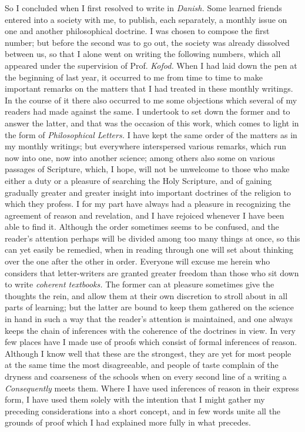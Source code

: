 \documentclass[12pt,a4paper,openany]{book}
\newcommand{\opage}[1]{\marginnote{\footnotesize\textit{[#1]}}}
\begin{document}
So I concluded when I first resolved to write in \emph{Danish.} Some learned
friends entered into a society with me, to publish, each separately, a monthly
issue on one and another philosophical doctrine. I was chosen to compose the first
number; but before the second was to go out, the society was already dissolved
between us, so that I alone went on writing the following numbers, which all
appeared under the supervision of Prof. \textit{Kofod.} When I had laid down the
pen at the beginning of last year, it occurred to me from time to time to make
important remarks on the matters that I had treated in these monthly writings. In
the course of it there also occurred to me some objections which several of my
readers had made against the same. I undertook to set down the former and to
answer the latter, and that was the occasion of this work, which comes to light in
the form of \emph{Philosophical Letters.} I have kept the same order of the
matters as in my monthly writings; but everywhere interspersed various remarks,
which run now into one, now into another science; among others also some on
various passages of Scripture, which, I hope, will not be unwelcome to those who
make either a duty
\setcounter{footnote}{0}%
\opage{39}or a pleasure of searching the Holy Scripture, and of gaining gradually
greater and greater insight into important doctrines of the religion to which they
profess. I for my part have always had a pleasure in recognizing the agreement of
reason and revelation, and I have rejoiced whenever I have been able to find it.
Although the order sometimes seems to be confused, and the reader's attention
perhaps will be divided among too many things at once, so
this can yet easily be remedied, when in reading through one will set about
thinking over the one after the other in order. Everyone will excuse me herein who
considers that letter-writers are granted greater freedom than those who sit down
to write \emph{coherent textbooks.} The former can at pleasure sometimes give the
thoughts the rein, and allow them at their own discretion to stroll about in all
parts of learning; but the latter are bound to keep them gathered on the science in
hand in such a way that the reader's attention is maintained, and one always keeps
the chain of inferences with the coherence of the doctrines in view. In very few
places have I made use of proofs which consist of formal inferences of reason.
Although I know well that these are the strongest, they are yet for most people at
the same time the most disagreeable, and people of taste complain of the dryness
and coarseness of the schools when on every second line of a writing a
\emph{Consequently} meets them. Where I have used inferences of reason in their
express form, I have used them solely with the intention that I might gather my
preceding considerations into a short concept, and in few words unite all the
grounds of proof which I had explained more fully in what precedes.
\end{document}
